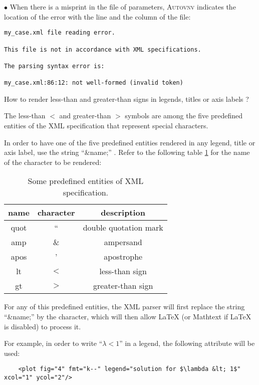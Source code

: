 \documentclass[a4paper,10pt,twoside]{csshortdoc}
\begin{document}
\begin{list}{$\bullet$}{}
When there is a misprint in the file of parameters,
\textsc{Autovnv} indicates the location of the error
with the line and the column of the file:
\small
\begin{verbatim}
my_case.xml file reading error.

This file is not in accordance with XML specifications.

The parsing syntax error is:

my_case.xml:86:12: not well-formed (invalid token)
\end{verbatim}
\normalsize

\item How to render less-than and greater-than signs in legends, titles or axis labels ?

The less-than $<$ and greater-than $>$ symbols are among the five predefined
entities of the XML specification that represent special characters.

In order to have one of the five predefined entities rendered in any legend, title or axis
label, use the string ``\&name;'' . Refer to the following table \ref{table:XMLPredefEnt}
for the name of the character to be rendered:

\begin{table}[htbp]
\begin{center}
\begin{tabular}{|c|c|c|}
\hline
\textbf{name} & \textbf{character} & \textbf{description} \\
\hline
quot & ``  & double quotation mark \\
amp  & \&  & ampersand             \\
apos & '   & apostrophe            \\
lt   & $<$ & less-than sign        \\
gt   & $>$ & greater-than sign     \\
\hline
\end{tabular}
\end{center}
\caption{Some predefined entities of XML specification.}
\label{table:XMLPredefEnt}
\end{table}

For any of this predefined entities, the XML parser will first replace the string ``\&name;''
by the character, which will then allow LaTeX (or Mathtext if LaTeX is disabled) to process it.

For example, in order to write ``$\lambda<1$'' in a legend, the following attribute will be used:
\small
\begin{verbatim}
    <plot fig="4" fmt="k--" legend="solution for $\lambda &lt; 1$" xcol="1" ycol="2"/>
\end{verbatim}
\normalsize


\end{list}
\end{document}
